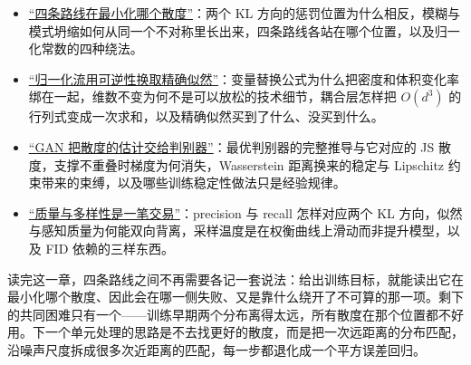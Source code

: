 \begin{itemize}
\tightlist
\item \hyperref[sec:14-Deep-Learning/07-Generative-Models-Unified/01]{``四条路线在最小化哪个散度''}：两个 KL 方向的惩罚位置为什么相反，模糊与模式坍缩如何从同一个不对称里长出来，四条路线各站在哪个位置，以及归一化常数的四种绕法。
\item \hyperref[sec:14-Deep-Learning/07-Generative-Models-Unified/02]{``归一化流用可逆性换取精确似然''}：变量替换公式为什么把密度和体积变化率绑在一起，维数不变为何不是可以放松的技术细节，耦合层怎样把 \(O(d^3)\) 的行列式变成一次求和，以及精确似然买到了什么、没买到什么。
\item \hyperref[sec:14-Deep-Learning/07-Generative-Models-Unified/03]{``GAN 把散度的估计交给判别器''}：最优判别器的完整推导与它对应的 JS 散度，支撑不重叠时梯度为何消失，Wasserstein 距离换来的稳定与 Lipschitz 约束带来的束缚，以及哪些训练稳定性做法只是经验规律。
\item \hyperref[sec:14-Deep-Learning/07-Generative-Models-Unified/04]{``质量与多样性是一笔交易''}：precision 与 recall 怎样对应两个 KL 方向，似然与感知质量为何能双向背离，采样温度是在权衡曲线上滑动而非提升模型，以及 FID 依赖的三样东西。
\end{itemize}

读完这一章，四条路线之间不再需要各记一套说法：给出训练目标，就能读出它在最小化哪个散度、因此会在哪一侧失败、又是靠什么绕开了不可算的那一项。剩下的共同困难只有一个——训练早期两个分布离得太远，所有散度在那个位置都不好用。下一个单元处理的思路是不去找更好的散度，而是把一次远距离的分布匹配，沿噪声尺度拆成很多次近距离的匹配，每一步都退化成一个平方误差回归。
